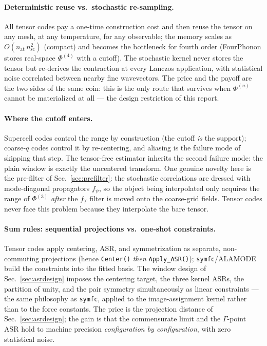 \documentclass[11pt,a4paper]{article}
\newcommand{\fY}{f_{\Upsilon}}
\newcommand{\fpsi}{f_{\psi}}
\newcommand{\nat}{n_{\mathrm{at}}}
\begin{document}
\paragraph{Deterministic reuse vs.\ stochastic re-sampling.}  All tensor
codes pay a one-time construction cost and then reuse the tensor on any
mesh, at any temperature, for any observable; the memory scales as
$O(\nat\,n_{\mathrm{sc}}^2)$ (compact) and becomes the bottleneck for
fourth order (FourPhonon \cite{fourphonon} stores real-space
$\Phi^{(4)}$ with a cutoff).  The stochastic kernel never stores the
tensor but re-derives the contraction at every Lanczos application, with
statistical noise correlated between nearby fine wavevectors.  The price
and the payoff are the two sides of the same coin: this is the only
route that survives when $\Phi^{(n)}$ cannot be materialized at all ---
the design restriction of this report.

\paragraph{Where the cutoff enters.}  Supercell codes control the range
by construction (the cutoff \emph{is} the support); coarse-$q$ codes
control it by re-centering, and aliasing is the failure mode of skipping
that step.  The tensor-free estimator inherits the second failure mode:
the plain window is exactly the uncentered transform.  One genuine
novelty here is the pre-filter of Sec.~\ref{sec:prefilter}: the
stochastic correlations are dressed with mode-diagonal propagators
$\fpsi$, so the object being interpolated only acquires the range of
$\Phi^{(3)}$ \emph{after} the $\fY$ filter is moved onto the coarse-grid
fields.  Tensor codes never face this problem because they interpolate
the bare tensor.

\paragraph{Sum rules: sequential projections vs.\ one-shot constraints.}
Tensor codes apply centering, ASR, and symmetrization as separate,
non-commuting projections (hence \texttt{Center()} \emph{then}
\texttt{Apply\_ASR()}); \texttt{symfc}/ALAMODE build the constraints
into the fitted basis.  The window design of Sec.~\ref{sec:asrdesign}
imposes the centering target, the three kernel ASRs, the partition of
unity, and the pair symmetry simultaneously as linear constraints ---
the same philosophy as \texttt{symfc}, applied to the image-assignment
kernel rather than to the force constants.  The price is the projection
distance of Sec.~\ref{sec:asrdesign}; the gain is that the commensurate
limit and the $\Gamma$-point ASR hold to machine precision
\emph{configuration by configuration}, with zero statistical noise.
\end{document}
